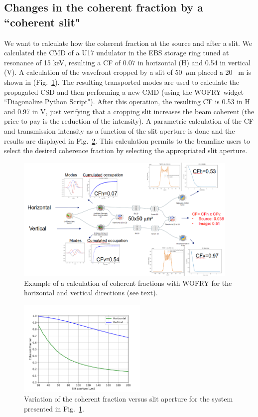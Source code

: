 \documentclass{iopconfser}
\begin{document}
\subsection{Changes in the coherent fraction by a ``coherent slit"}
We want to calculate how the coherent fraction at the source and after a slit. 
We calculated the CMD of a U17 undulator in the EBS storage ring tuned at resonance of 15 keV, resulting a CF of  0.07 in horizontal (H) and 0.54 in vertical (V).  A calculation of the wavefront cropped by a slit of 50~$\mu$m placed a 20~ m is shown in (Fig.~\ref{fig:croppingslit}). The resulting transported modes are used to calculate the propagated CSD and then performing a new CMD (using the WOFRY widget ``Diagonalize Python Script"). After this operation, the resulting CF is 0.53 in H and 0.97 in V, just verifying that a cropping slit increases the beam coherent (the price to pay is the reduction of the intensity). A parametric calculation of the CF and transmission intensity as a function of the slit aperture is done and the results are displayed in Fig.~\ref{fig:slitscan}. This calculation permits to the beamline users to select the desired coherence fraction by selecting the appropriated slit aperture. 

\begin{figure}[H]
    \centering
    \includegraphics[width=0.95\textwidth]{figures/croppingslit.png}
    \caption{Example of a calculation of coherent fractions with WOFRY for the horizontal and vertical directions (see text).}\label{fig:croppingslit}
\end{figure}

\begin{figure}
    \centering
    \includegraphics[width=0.55\textwidth]{figures/CFvsGap.pdf}
    \caption{Variation of the coherent fraction versus slit aperture for the system presented in Fig.~\ref{fig:croppingslit}.   }\label{fig:slitscan}
\end{figure}
\end{document}

